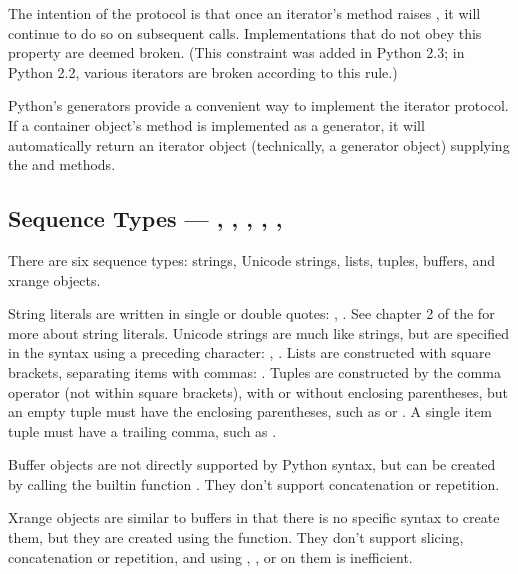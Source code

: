 The intention of the protocol is that once an iterator's
 method raises , it will
continue to do so on subsequent calls.  Implementations that
do not obey this property are deemed broken.  (This constraint
was added in Python 2.3; in Python 2.2, various iterators are
broken according to this rule.)

Python's generators provide a convenient way to implement the
iterator protocol.  If a container object's 
method is implemented as a generator, it will automatically
return an iterator object (technically, a generator object)
supplying the  and  methods.


\subsection{Sequence Types ---
	    , , ,
	    , , 
	    \label{typesseq}}

There are six sequence types: strings, Unicode strings, lists,
tuples, buffers, and xrange objects.

String literals are written in single or double quotes:
, .  See chapter 2 of the
 for more about
string literals.  Unicode strings are much like strings, but are
specified in the syntax using a preceding  character:
, .  Lists are constructed with square brackets,
separating items with commas: \code{[a, b, c]}.  Tuples are
constructed by the comma operator (not within square brackets), with
or without enclosing parentheses, but an empty tuple must have the
enclosing parentheses, such as  or \code{()}.  A single
item tuple must have a trailing comma, such as .

Buffer objects are not directly supported by Python syntax, but can be
created by calling the builtin function
.  They don't support
concatenation or repetition.

Xrange objects are similar to buffers in that there is no specific
syntax to create them, but they are created using the 
function.  They don't support slicing,
concatenation or repetition, and using , ,
 or  on them is inefficient.

